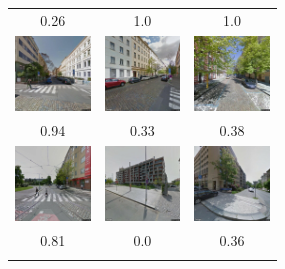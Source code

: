 \documentclass[border={5pt 1pt 5pt 5pt}, varwidth=38em]{standalone}
\begin{document}
\setlength{\tabcolsep}{0.1em}
{
\renewcommand{\arraystretch}{0.5}

\begin{table}[ht]
\centering
\begin{tabular}{ccc}
{\tiny 0.26} & {\tiny 1.0} & {\tiny 1.0}  \\
\includegraphics[width=20mm]{imgs_for_table/original/0003_0.jpg} & \includegraphics[width=20mm]{imgs_for_table/original/0002_5.jpg} & \includegraphics[width=20mm]{imgs_for_table/original/0004_3.jpg}\\
{\tiny 0.94} & {\tiny 0.33} & {\tiny 0.38}  \\
\newline
\includegraphics[width=20mm]{imgs_for_table/original/0013_0.jpg} & \includegraphics[width=20mm]{imgs_for_table/original/0021_5.jpg} & \includegraphics[width=20mm]{imgs_for_table/original/0023_1.jpg}\\
{\tiny 0.81} & {\tiny 0.0} & {\tiny 0.36}  \\
\newline

\end{tabular}
\end{table}}
\end{document}
